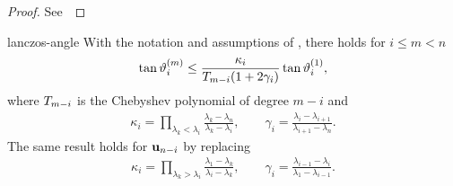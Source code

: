 \begin{proof}
  See~\cite[Lemma 6.1]{Saad11}
\end{proof}

\begin{Theorem}{lanczos-angle}
  With the notation and assumptions of , there holds for $i\le m < n$
  \begin{gather}
    \tan\vartheta_i^{(m)} \le \frac{\kappa_i}{T_{m-i}(1+2\gamma_i)}\tan\vartheta_i^{(1)},
  \end{gather}
  where $T_{m-i}$ is the Chebyshev polynomial of degree $m-i$ and
  \begin{gather}
    \kappa_i=\prod_{\lambda_k < \lambda_i} \frac{\lambda_k-\lambda_n}{\lambda_k-\lambda_i},
    \qquad \gamma_i = \frac{\lambda_{i}-\lambda_{i+1}}{\lambda_{i+1}-\lambda_{n}}.
  \end{gather}
  The same result holds for $\mathbf u_{n-i}$ by replacing
  \begin{gather}
    \kappa_i=\prod_{\lambda_k > \lambda_i} \frac{\lambda_1-\lambda_k}{\lambda_i-\lambda_k},
    \qquad \gamma_i = \frac{\lambda_{i-1}-\lambda_{i}}{\lambda_{1}-\lambda_{i-1}}.
  \end{gather}  
\end{Theorem}

